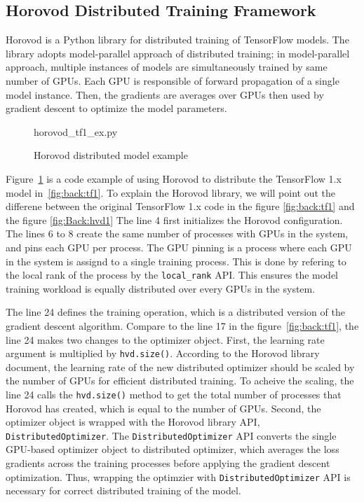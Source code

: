 \subsection{Horovod Distributed Training Framework}

Horovod is a Python library for distributed training of TensorFlow models.
The library adopts model-parallel approach of distributed training;
in model-parallel approach, multiple instances of models are simultaneously
trained by same number of GPUs.
Each GPU is responsible of forward propagation of a single model instance.
Then, the gradients are averages over GPUs then used by gradient descent
to optimize the model parameters. 

\begin{figure}[ht!]
 
{horovod_tf1_ex.py}
  \caption{Horovod distributed model example}
\label{fig:back:hvd1} 
\end{figure}

Figure~\ref{fig:back:hvd1} is a code example of using Horovod to distribute
the TensorFlow 1.x model in~\ref{fig:back:tf1}.
To explain the Horovod library,
we will point out the differene between the original TensorFlow 1.x code in
the figure \ref{fig:back:tf1} and the figure \ref{fig:Back:hvd1}
The line 4 first initializes the Horovod configuration.
The lines 6 to 8 create the same number of processes with GPUs in the system,
and pins each GPU per process. 
The GPU pinning is a process where each GPU in the system is assignd to a single 
training process.
This is done by refering to the local rank of the process 
by the {\tt local\_rank} API.
This ensures the model training workload is equally distributed over
every GPUs in the system.

The line 24 defines the training operation, which is a distributed version
of the gradient descent algorithm.
Compare to the line 17 in the figure~\ref{fig:back:tf1},
the line 24 makes two changes to the optimizer object.
First, the learning rate argument is multiplied by {\tt hvd.size()}.
According to the Horovod library document,
the learning rate of the new distributed optimizer 
should be scaled by the number of GPUs for efficient distributed training.
To acheive the scaling, the line 24 calls the {\tt hvd.size()} method to
get the total number of processes that Horovod has created,
which is equal to the number of GPUs.
Second, the optimizer object is wrapped with the Horovod library API,
{\tt DistributedOptimizer}.
The {\tt DistributedOptimizer} API converts the single GPU-based optimizer 
object to distributed optimizer, which averages the loss gradients across the
training processes before applying the gradient descent optimization.
Thus, wrapping the optimzier with {\tt DistributedOptimizer} API is necessary
for correct distributed training of the model.

